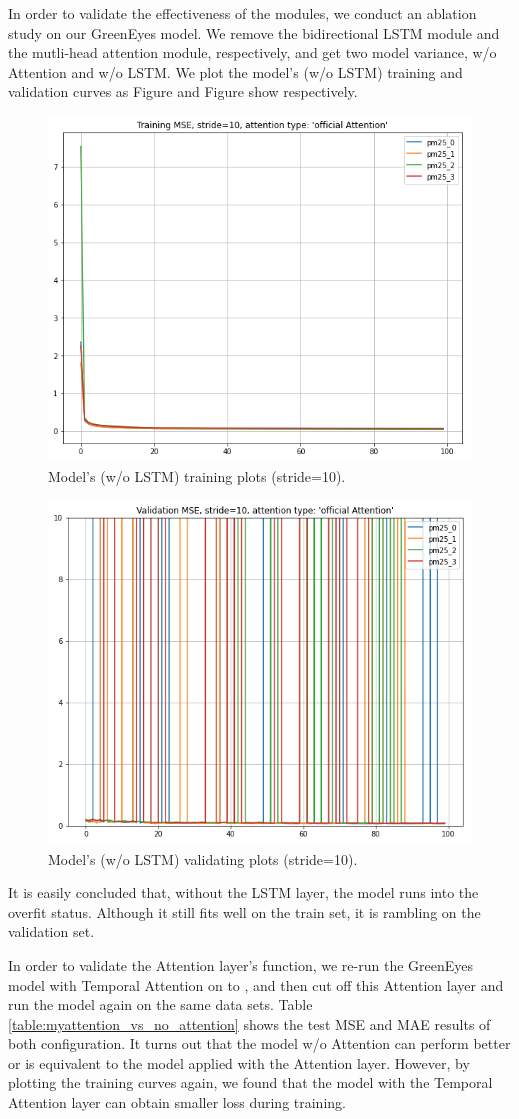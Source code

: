 \documentclass[sigconf]{acmart}
\begin{document}
In order to validate the effectiveness of the modules, we conduct an ablation study on our GreenEyes model. We remove the bidirectional LSTM module and the mutli-head attention module, respectively, and get two model variance, w/o Attention and w/o LSTM. We plot the model's (w/o LSTM) training and validation curves as Figure and Figure show respectively.

\begin{figure}[!htbp]
    \centering
    \includegraphics[width=0.6\linewidth]{fig/results/ablation/wo-LSTM-training.png}
    \caption{Model's (w/o LSTM) training plots (stride=10).}
    \label{fig:wo-LSTM-training}
\end{figure}

\begin{figure}[!htbp]
    \centering
    \includegraphics[width=0.6\linewidth]{fig/results/ablation/wo-LSTM-validation.png}
    \caption{Model's (w/o LSTM) validating plots (stride=10).}
    \label{fig:wo-LSTM-validation}
\end{figure}

It is easily concluded that, without the LSTM layer, the model runs into the overfit status. Although it still fits well on the train set, it is rambling on the validation set.

In order to validate the Attention layer's function, we re-run the GreenEyes model with Temporal Attention on  to , and then cut off this Attention layer and run the model again on the same data sets. Table \ref{table:myattention_vs_no_attention} shows the test MSE and MAE results of both configuration. It turns out that the model w/o Attention can perform better or is equivalent to the model applied with the Attention layer. However, by plotting the training curves again, we found that the model with the Temporal Attention layer can obtain smaller loss during training. 
\end{document}
